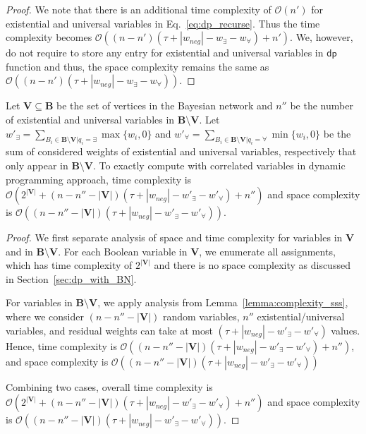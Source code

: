 \begin{proof}
			We note that there is an additional time complexity of $ \mathcal{O}(n') $ for existential and universal variables in Eq.~\eqref{eq:dp_recurse}. Thus the time complexity becomes $ \mathcal{O}((n - n')(\tau + |w_{neg}| - w_{\exists} - w_{\forall}) + n') $. We, however, do not require to store any entry for existential and universal variables in $ \mathsf{dp} $  function and thus, the space complexity remains the same as $ \mathcal{O}((n - n')(\tau + |w_{neg}| - w_{\exists} - w_{\forall})) $.
		\end{proof}
	
		\begin{lemmarep}
			Let $ \mathbf{V} \subseteq \mathbf{B} $ be the set of vertices in the Bayesian network and $ n'' $ be the number of existential and universal variables in $ \mathbf{B} \setminus \mathbf{V} $. Let $ w'_{\exists} = \sum_{B_i \in \mathbf{B} \setminus \mathbf{V} | q_i = \exists} \max\{w_i, 0\}$  and $ w'_{\forall} = \sum_{B_i \in \mathbf{B} \setminus \mathbf{V} | q_i = \forall} \min\{w_i, 0\}$ be the sum of considered weights of existential and universal variables, respectively that only appear in $ \mathbf{B} \setminus \mathbf{V} $. To exactly compute {\stochastic} with correlated variables in dynamic programming approach,  time complexity is $ \mathcal{O}(2^{|\mathbf{V}|} + (n - n'' - |\mathbf{V}|)(\tau + |w_{neg}| - w'_{\exists} - w'_{\forall}) + n'') $ and space complexity is $ \mathcal{O}((n - n'' - |\mathbf{V}|)(\tau + |w_{neg}| - w'_{\exists} - w'_{\forall})) $.
		\end{lemmarep}	
	
	
		
	
		\begin{proof}
			We first separate analysis of space and time complexity for variables in $ \mathbf{V} $ and in $\mathbf{B}\setminus \mathbf{V} $. For each Boolean variable in $ \mathbf{V} $, we enumerate all assignments, which has time complexity of $ 2^{|\mathbf{V}|} $ and there is no space complexity as discussed in Section~\ref{sec:dp_with_BN}. 
			
			
			For variables in $\mathbf{B}\setminus \mathbf{V} $, we apply analysis from  Lemma~\ref{lemma:complexity_sss}, where we consider $ (n - n'' - |\mathbf{V}|) $ random variables, $ n'' $ existential/universal variables, and residual weights can take at most $ (\tau + |w_{neg}| - w'_{\exists} - w'_{\forall}) $ values. Hence, time complexity is $ \mathcal{O}((n - n'' - |\mathbf{V}|)(\tau + |w_{neg}| - w'_{\exists} - w'_{\forall}) + n'') $, and space complexity is $ \mathcal{O}((n - n'' - |\mathbf{V}|)(\tau + |w_{neg}| - w'_{\exists} - w'_{\forall})) $ 
			
			Combining two cases, overall time complexity is $ \mathcal{O}(2^{|\mathbf{V}|} + (n - n'' - |\mathbf{V}|)(\tau + |w_{neg}| - w'_{\exists} - w'_{\forall}) + n'') $ and space complexity is $ \mathcal{O}((n - n'' - |\mathbf{V}|)(\tau + |w_{neg}| - w'_{\exists} - w'_{\forall})) $. 
		\end{proof}
		
